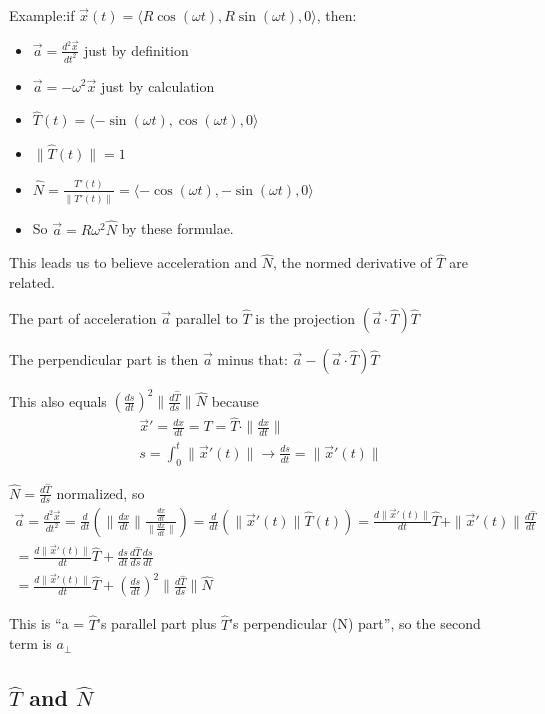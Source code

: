 \documentclass[11pt, oneside]{article}   	%
\begin{document}
Example:if  $\vec{x}(t) = \langle R\cos(\omega t), R\sin(\omega t), 0 \rangle$, then:
\begin{itemize}
\item $\vec{a} = \frac{d^2\vec{x}}{dt^2}$ just by definition
\item $\vec{a} = -\omega^2 \vec{x}$ just by calculation
\item $\hat{T}(t) = \langle -\sin(\omega t), \cos (\omega t), 0 \rangle$
\item $\| \hat{T}(t) \| = 1$
\item $\hat{N} = \frac{\hat{T}'(t)} { \| \hat{T}'(t) \|} =  \langle -\cos(\omega t), -\sin (\omega t), 0 \rangle$
\item So $\vec{a} = R\omega^2\hat{N}$ by these formulae.
\end{itemize}

This leads us to believe acceleration and $\hat{N}$, the normed derivative of $\hat{T}$ are related.

The part of acceleration $\vec{a}$ parallel to $\hat{T}$ is the projection $(\vec{a} \cdot \hat{T}) \hat{T}$

The perpendicular part is then $\vec{a}$ minus that: $\vec{a} - (\vec{a} \cdot \hat{T}) \hat{T}$

This also equals $(\frac{ds}{dt})^2 \|\frac{d\hat{T}}{ds} \| \hat{N}$ because
\begin{align}
\vec{x}' = \frac{dx}{dt} = T = \hat{T} \cdot \|  \frac{dx}{dt} \| \\
s = \int_0^t \| \vec{x}'(t) \| \rightarrow \frac{ds}{dt} = \| \vec{x}'(t) \|  
\end{align}

$\hat{N} = \frac{d\hat{T}}{ds}$ normalized, so
\begin{align}
\vec{a} = \frac{d^2\vec{x}}{dt^2} = \frac{d}{dt}(\|\frac{dx}{dt}\|  \frac{\frac{dx}{dt}} {\|\frac{dx}{dt}\|} ) = \frac{d}{dt}(\| \vec{x}'(t)\|\hat{T}(t)) = \frac{d \|\vec{x}'(t) \|}{dt}\hat{T} + \| \vec{x}'(t) \| \frac{d\hat{T}}{dt} \\
= \frac{d \|\vec{x}'(t) \|}{dt}\hat{T} + \frac{ds}{dt} \frac{d\hat{T}}{ds} \frac{ds}{dt} \\ 
= \frac{d \|\vec{x}'(t) \|}{dt}\hat{T} + (\frac{d{s}}{dt} )^2 \| \frac{d\hat{T}}{ds} \| \hat{N}
\end{align}

This is ``a = $\hat{T}$'s parallel part plus $\hat{T}$'s perpendicular (N) part'', so the second term is $a_{\bot}$

\subsection{$\hat{T}$ and $\hat{N}$}
\end{document}

